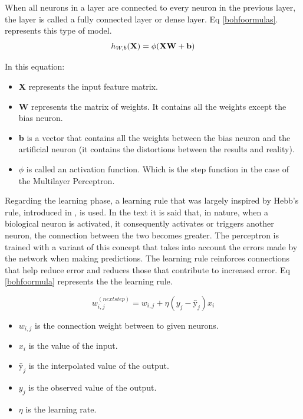 When all neurons in a layer are connected to every neuron in the previous layer, the layer is called a fully connected layer or dense layer.
Eq \eqref{bohfoormulas}. represents this type of model.
\begin{equation} 
   h_ {W,b} ({\bf X}) = \phi({\bf XW + b})
    \label{bohfoormulas}
\end{equation} 

In this equation:
\begin{itemize}
    \item \textbf{X} represents the input feature matrix.
    \item \textbf{W} represents the matrix of weights. It contains all the weights except the bias neuron.

    \item \textbf{b} is a vector that contains all the weights between the bias neuron and the artificial neuron (it contains the distortions between the results and reality).
    \item \textbf{$\phi$} is called an activation function. Which is the step function in the case of the Multilayer Perceptron.
\end{itemize}

Regarding the learning phase, a learning rule that was largely inspired by Hebb's rule, introduced in \citeauthor{19} \autocite{19}, is used. In the text it is said that, in nature, when a biological neuron is activated, it consequently activates or triggers another neuron, the connection between the two becomes greater. The perceptron is trained with a variant of this concept that takes into account the errors made by the network when making predictions. The learning rule reinforces connections that help reduce error and reduces those that contribute to increased error. Eq \eqref{bohfoormula} represents the the learning rule.

\begin{equation} 
   w_ {i, j} ^{(next step)} = w _{i, j }+ \eta( y _{j} - ŷ_{j}) x_{i} 
    \label{bohfoormula}
\end{equation}

\begin{itemize}
    \item $w _{i, j}$ is the connection weight between to given neurons.
    \item $x_{i} $ is the value of the input.
    \item $ŷ _{j}$ is the interpolated value of the output.
    \item $y_{j}$ is the observed value of the output.
    \item $\eta$ is the learning rate.
\end{itemize}
